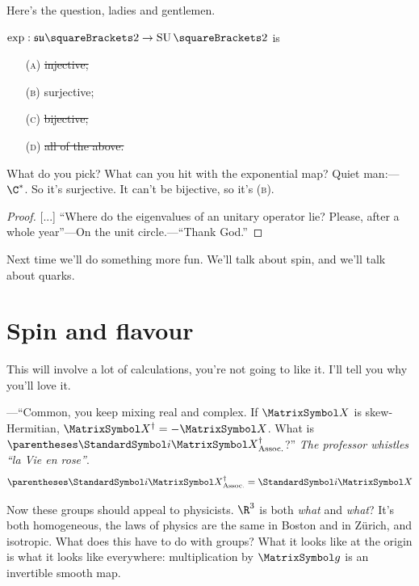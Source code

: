 \documentclass[10pt, a4paper, twoside]{lecturenotes}
\begin{document}
Here's the question, ladies and gentlemen.
\begin{proposition}
$\FunctionSpec{\exp}{\LAsutwo}{\SpecialUnitaryGroup\of 2}$ is\begin{itemize}
\item[(\textsc{a})]\st{injective;}
\item[(\textsc{b})]surjective;
\item[(\textsc{c})]\st{bijective;}
\item[(\textsc{d})]\st{all of the above.}
\end{itemize}
What do you pick? What can you hit with the exponential map? Quiet man:---$\NonZero\C$. So it's surjective. It can't be bijective, so it's (\textsc{b}). 
\begin{proof}{}[...]
``Where do the eigenvalues of an unitary operator lie? Please, after a whole year''---On the unit circle.---``Thank God.''
\end{proof}
\end{proposition}

Next time we'll do something more fun. We'll talk about spin, and we'll talk about quarks.

\section{Spin and flavour}
\NewLecture[date=2013-04-30, official=true]
This will involve a lot of calculations, you're not going to like it. I'll tell you why you'll love it.

---``Common, you keep mixing real and complex. If $\matX$ is skew-Hermitian, $\adj\matX=-\matX$. What is $\adj{\pa{\I\matX}}$?'' \emph{The professor whistles ``la Vie en rose''}.\[\adj{\pa{\I\matX}}=\I\matX\]

Now these groups should appeal to physicists. $\R^3$ is both \emph{what} and \emph{what}? It's both homogeneous, the laws of physics are the same in Boston and in Zürich, and isotropic. What does this have to do with groups? What it looks like at the origin is what it looks like everywhere: multiplication by $\matg$ is an invertible smooth map.
\end{document}
